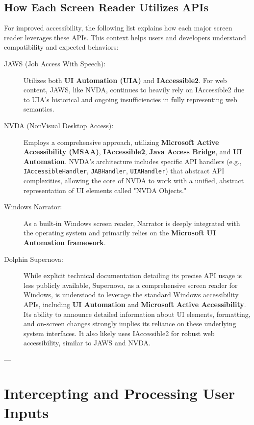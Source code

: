 \subsection{How Each Screen Reader Utilizes APIs}
\label{subsec:screenreader-api-usage}
For improved accessibility, the following list explains how each major screen reader leverages these APIs. This context helps users and developers understand compatibility and expected behaviors:

\begin{description}
    \item[JAWS (Job Access With Speech):] Utilizes both \textbf{UI Automation (UIA)} and \textbf{IAccessible2}. For web content, JAWS, like NVDA, continues to heavily rely on IAccessible2 due to UIA's historical and ongoing insufficiencies in fully representing web semantics. \cite{JantridIAccessible2, JAWSUIAScriptAPI}
    \item[NVDA (NonVisual Desktop Access):] Employs a comprehensive approach, utilizing \textbf{Microsoft Active Accessibility (MSAA)}, \textbf{IAccessible2}, \textbf{Java Access Bridge}, and \textbf{UI Automation}. \cite{NVDAAPIsClym, AssistivLabsNVDAArch} NVDA's architecture includes specific API handlers (e.g., \texttt{IAccessibleHandler}, \texttt{JABHandler}, \texttt{UIAHandler}) that abstract API complexities, allowing the core of NVDA to work with a unified, abstract representation of UI elements called "NVDA Objects."
    \item[Windows Narrator:] As a built-in Windows screen reader, Narrator is deeply integrated with the operating system and primarily relies on the \textbf{Microsoft UI Automation framework}. \cite{NarratorTechDetails}
    \item[Dolphin Supernova:] While explicit technical documentation detailing its precise API usage is less publicly available, Supernova, as a comprehensive screen reader for Windows, is understood to leverage the standard Windows accessibility APIs, including \textbf{UI Automation} and \textbf{Microsoft Active Accessibility}. \cite{SuperNovaMagnifierScreenReader} Its ability to announce detailed information about UI elements, formatting, and on-screen changes strongly implies its reliance on these underlying system interfaces. It also likely uses IAccessible2 for robust web accessibility, similar to JAWS and NVDA.
\end{description}

---

\section{Intercepting and Processing User Inputs}
\label{sec:intercepting-inputs}

